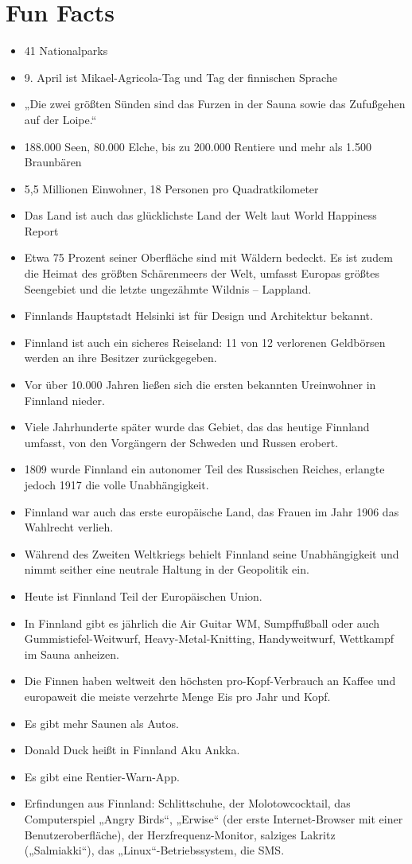 \section*{Fun Facts}

\begin{itemize}
	\item 41 Nationalparks
	\item 9. April ist Mikael-Agricola-Tag und Tag der finnischen Sprache
	\item „Die zwei größten Sünden sind das Furzen in der Sauna sowie das Zufußgehen auf der Loipe.“
	\item 188.000 Seen, 80.000 Elche, bis zu 200.000 Rentiere und mehr als 1.500 Braunbären
	\item 5,5 Millionen Einwohner, 18 Personen pro Quadratkilometer
	\item Das Land ist auch das glücklichste Land der Welt laut World Happiness Report
	\item Etwa 75 Prozent seiner Oberfläche sind mit Wäldern bedeckt. Es ist zudem die Heimat des größten Schärenmeers der Welt, umfasst Europas größtes Seengebiet und die letzte ungezähmte Wildnis – Lappland.
	\item Finnlands Hauptstadt Helsinki ist für Design und Architektur bekannt.
	\item Finnland ist auch ein sicheres Reiseland: 11 von 12 verlorenen Geldbörsen werden an ihre Besitzer zurückgegeben.
	\item Vor über 10.000 Jahren ließen sich die ersten bekannten Ureinwohner in Finnland nieder.
	\item Viele Jahrhunderte später wurde das Gebiet, das das heutige Finnland umfasst, von den Vorgängern der Schweden und Russen erobert.
	\item 1809 wurde Finnland ein autonomer Teil des Russischen Reiches, erlangte jedoch 1917 die volle Unabhängigkeit.
	\item Finnland war auch das erste europäische Land, das Frauen im Jahr 1906 das Wahlrecht verlieh.
	\item Während des Zweiten Weltkriegs behielt Finnland seine Unabhängigkeit und nimmt seither eine neutrale Haltung in der Geopolitik ein.
	\item Heute ist Finnland Teil der Europäischen Union.
	\item In Finnland gibt es jährlich die Air Guitar WM, Sumpffußball oder auch Gummistiefel-Weitwurf, Heavy-Metal-Knitting, Handyweitwurf, Wettkampf im Sauna anheizen.
	\item Die Finnen haben weltweit den höchsten pro-Kopf-Verbrauch an Kaffee und europaweit die meiste verzehrte Menge Eis pro Jahr und Kopf.
	\item Es gibt mehr Saunen als Autos.
	\item Donald Duck heißt in Finnland Aku Ankka.
	\item Es gibt eine Rentier-Warn-App.
	\item Erfindungen aus Finnland: Schlittschuhe, der Molotowcocktail, das Computerspiel „Angry Birds“, „Erwise“ (der erste Internet-Browser mit einer Benutzeroberfläche), der Herzfrequenz-Monitor, salziges Lakritz („Salmiakki“), das „Linux“-Betriebssystem, die SMS.
\end{itemize}
